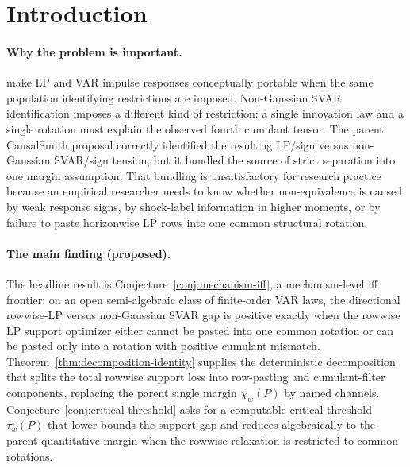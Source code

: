 \documentclass[11pt]{article}
\theoremstyle{definition}
\theoremstyle{plain}
\theoremstyle{remark}
\begin{document}
\section{Introduction}
\paragraph{Why the problem is important.}
\citet{PlagborgMollerWolf2021} make LP and VAR impulse responses conceptually portable when the same population identifying restrictions are imposed.  Non-Gaussian SVAR identification imposes a different kind of restriction: a single innovation law and a single rotation must explain the observed fourth cumulant tensor.  The parent CausalSmith proposal correctly identified the resulting LP/sign versus non-Gaussian SVAR/sign tension, but it bundled the source of strict separation into one margin assumption.  That bundling is unsatisfactory for research practice because an empirical researcher needs to know whether non-equivalence is caused by weak response signs, by shock-label information in higher moments, or by failure to paste horizonwise LP rows into one common structural rotation.

\paragraph{The main finding (proposed).}
The headline result is Conjecture~\ref{conj:mechanism-iff}, a mechanism-level iff frontier: on an open semi-algebraic class of finite-order VAR laws, the directional rowwise-LP versus non-Gaussian SVAR gap is positive exactly when the rowwise LP support optimizer either cannot be pasted into one common rotation or can be pasted only into a rotation with positive cumulant mismatch.  Theorem~\ref{thm:decomposition-identity} supplies the deterministic decomposition that splits the total rowwise support loss into row-pasting and cumulant-filter components, replacing the parent single margin \(\chi_w(P)\) by named channels.  Conjecture~\ref{conj:critical-threshold} asks for a computable critical threshold \(\tau_w^\star(P)\) that lower-bounds the support gap and reduces algebraically to the parent quantitative margin when the rowwise relaxation is restricted to common rotations.
\end{document}
